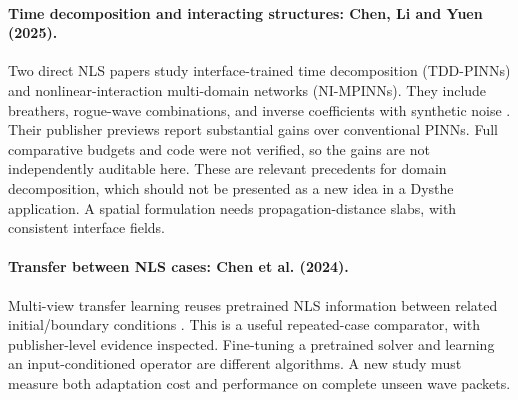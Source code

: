 \paragraph{Time decomposition and interacting structures: Chen, Li and Yuen (2025).}
Two direct NLS papers study interface-trained time decomposition
(TDD-PINNs) and nonlinear-interaction multi-domain networks (NI-MPINNs).
They include breathers, rogue-wave combinations, and inverse coefficients
with synthetic noise \cite{tdd,interaction}. Their publisher previews report
substantial gains over conventional PINNs. Full comparative budgets and
code were not verified, so the gains are not independently auditable here.
These are relevant precedents for domain decomposition, which should not
be presented as a new idea in a Dysthe application. A spatial formulation
needs propagation-distance slabs, with consistent interface fields.

\paragraph{Transfer between NLS cases: Chen et al. (2024).}
Multi-view transfer learning reuses pretrained NLS information between
related initial/boundary conditions \cite{transfer}. This is a useful
repeated-case comparator, with publisher-level evidence inspected.
Fine-tuning a pretrained solver and learning an input-conditioned operator
are different algorithms. A new study must measure both adaptation cost
and performance on complete unseen wave packets.


